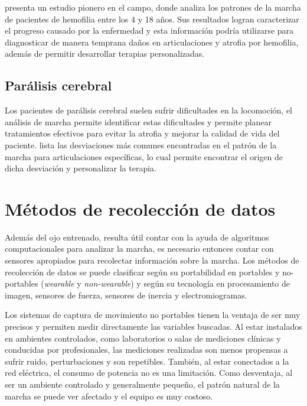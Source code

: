 \cite{forneris} presenta un estudio pionero en el campo, donde analiza los patrones de la marcha de pacientes de hemofilia entre los 4 y 18 años. Sus resultados logran caracterizar el progreso causado por la enfermedad y esta información podría utilizarse para diagnosticar de manera temprana daños en articulaciones y atrofia por hemofilia, además de permitir desarrollar terapias personalizadas. 

\subsection{Parálisis cerebral}

Los pacientes de parálisis cerebral suelen sufrir dificultades en la locomoción, el análisis de marcha permite identificar estas dificultades y permite planear tratamientos efectivos para evitar la atrofia y mejorar la calidad de vida del paciente. \cite{sangeux} lista las desviaciones más comunes encontradas en el patrón de la marcha para articulaciones específicas, lo cual permite encontrar el origen de dicha desviación y personalizar la terapia.


\section[Métodos de recolección]{Métodos de recolección de datos}

Además del ojo entrenado, resulta útil contar con la ayuda de algoritmos computacionales para analizar la marcha, es necesario entonces contar con sensores apropiados para recolectar información sobre la marcha. Los métodos de recolección de datos se puede clasificar según su portabilidad en portables y no-portables (\emph{wearable} y \emph{non-wearable}) y según su tecnología en procesamiento de imagen, sensores de fuerza, sensores de inercia y electromiogramas. \citep{muro}

Los sistemas de captura de movimiento no portables tienen la ventaja de ser muy precisos y permiten medir directamente las variables buscadas. Al estar instalados en ambientes controlados, como laboratorios o salas de mediciones clínicas y conducidas por profesionales, las mediciones realizadas son menos propensas a sufrir ruido, perturbaciones y son repetibles. También, al estar conectados a la red eléctrica, el consumo de potencia no es una limitación. Como desventaja, al ser un ambiente controlado y generalmente pequeño, el patrón natural de la marcha se puede ver afectado y el equipo es muy costoso. \citep{muro}

